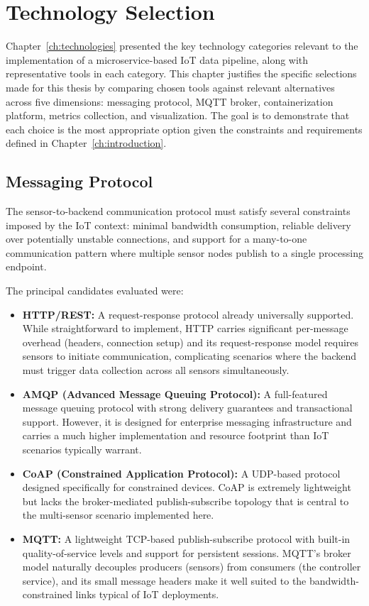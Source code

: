 \chapter{Technology Selection} \label{ch:tool_selection}

Chapter~\ref{ch:technologies} presented the key technology categories relevant to the implementation of a microservice-based IoT data pipeline, along with representative tools in each category. This chapter justifies the specific selections made for this thesis by comparing chosen tools against relevant alternatives across five dimensions: messaging protocol, MQTT broker, containerization platform, metrics collection, and visualization. The goal is to demonstrate that each choice is the most appropriate option given the constraints and requirements defined in Chapter~\ref{ch:introduction}.

\section{Messaging Protocol}

The sensor-to-backend communication protocol must satisfy several constraints imposed by the IoT context: minimal bandwidth consumption, reliable delivery over potentially unstable connections, and support for a many-to-one communication pattern where multiple sensor nodes publish to a single processing endpoint.

The principal candidates evaluated were:

\begin{itemize}
    \item \textbf{HTTP/REST:} A request-response protocol already universally supported. While straightforward to implement, HTTP carries significant per-message overhead (headers, connection setup) and its request-response model requires sensors to initiate communication, complicating scenarios where the backend must trigger data collection across all sensors simultaneously.
    \item \textbf{AMQP (Advanced Message Queuing Protocol):} A full-featured message queuing protocol with strong delivery guarantees and transactional support. However, it is designed for enterprise messaging infrastructure and carries a much higher implementation and resource footprint than IoT scenarios typically warrant.
    \item \textbf{CoAP (Constrained Application Protocol):} A UDP-based protocol designed specifically for constrained devices. CoAP is extremely lightweight but lacks the broker-mediated publish-subscribe topology that is central to the multi-sensor scenario implemented here.
    \item \textbf{MQTT:} A lightweight TCP-based publish-subscribe protocol with built-in quality-of-service levels and support for persistent sessions. MQTT's broker model naturally decouples producers (sensors) from consumers (the controller service), and its small message headers make it well suited to the bandwidth-constrained links typical of IoT deployments\cite{mqtt}.
\end{itemize}

